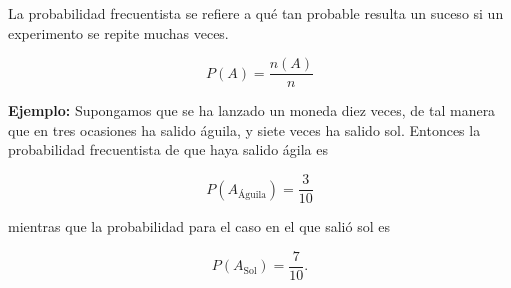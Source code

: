 \noindent La probabilidad frecuentista se refiere a qué tan probable resulta un suceso si un experimento se repite muchas veces.

\begin{equation}
    P(A) = \frac{n(A)}{n}
    \label{1.1.2 Probabilidad frecuentista}
\end{equation}

\noindent\textbf{Ejemplo: } Supongamos que se ha lanzado un moneda diez veces, de tal manera que en tres ocasiones ha salido águila, y siete veces ha salido sol. Entonces la probabilidad frecuentista de que haya salido ágila es

\begin{equation*}
    P(A_{\text{Águila}}) = \frac{3}{10}
\end{equation*}

\noindent mientras que la probabilidad para el caso en el que salió sol es

\begin{equation*}
    P(A_{\text{Sol}}) = \frac{7}{10}.
\end{equation*}